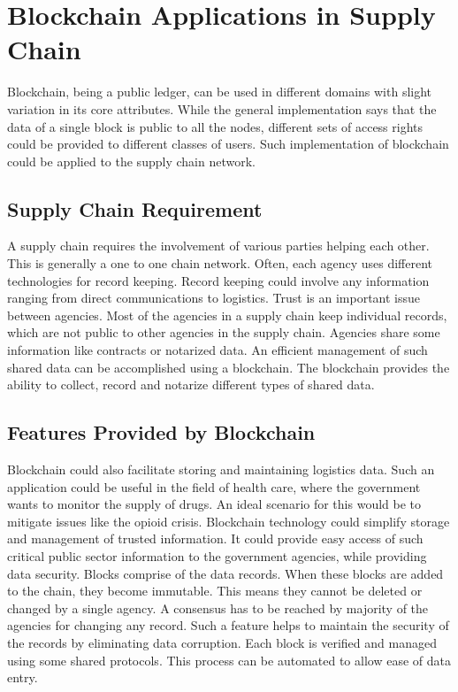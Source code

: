 \documentclass[sigconf]{acmart}
\begin{document}
\section{Blockchain Applications in Supply Chain}
Blockchain, being a public ledger, can be used in different domains with slight variation in its core attributes. While the general implementation says that the data of a single block is public to all the nodes, different sets of access rights could be provided to different classes of users.  Such implementation of blockchain could be applied to the supply chain network. 

\subsection{Supply Chain Requirement}
A supply chain requires the involvement of various parties helping each other. This is generally a one to one chain network. Often, each agency uses different technologies for record keeping. Record keeping could involve any information ranging from direct communications to logistics. Trust is an important issue between agencies. Most of the agencies in a supply chain keep individual records, which are not public to other agencies in the supply chain. Agencies share some information like contracts or notarized data. An efficient management of such shared data can be accomplished using a blockchain. The blockchain provides the ability to collect, record and notarize different types of shared data\cite{arbc1}. 

\subsection{Features Provided by Blockchain}
Blockchain could also facilitate storing and maintaining logistics data. Such an application could be useful in the field of health care, where the government wants to monitor the supply of drugs. An ideal scenario for this would be to mitigate issues like the opioid crisis. Blockchain technology could simplify storage and management of trusted information. It could provide easy access of such critical public sector information to the government agencies, while providing data security\cite{arbc2}. Blocks comprise of the data records. When these blocks are added to the chain, they become immutable. This means they cannot be deleted or changed by a single agency\cite{arbc2}. A consensus has to be reached by majority of the agencies for changing any record. Such a feature helps to maintain the security of the records by eliminating data corruption. Each block is verified and managed using some shared protocols. This process can be automated to allow ease of data entry.
\end{document}
